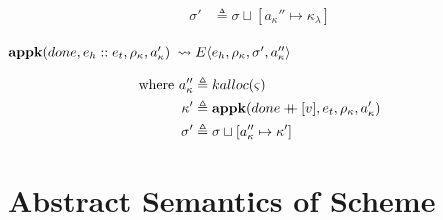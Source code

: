 \documentclass[12pt,draft]{article}
\newcommand\mdoubleplus{\ensuremath{\mathbin{+\mkern-9mu+}}}
\newcommand{\store}[0]{\sigma}
\newcommand{\kaddr}[0]{a_{\kappa}}
\newcommand{\kont}[0]{\kappa}
\newcommand{\state}[0]{\varsigma}
\newcommand{\E}[4]{E\langle #1 , #2 , #3 , #4 \rangle}
\begin{document}
\begin{multicols*}{2}
\begin{align*}
  \store' &\triangleq \store \sqcup [\kaddr'' \mapsto \kont_\lambda]
\end{align*}
\begin{center}
  $\textbf{appk}(done , e_h::e_t , \kenv , \kaddr')$
  $\leadsto \E{e_h}{\kenv}{\store'}{\kaddr''}$
\end{center}
\vspace{-7mm}
\begin{align*}
  \text{where }
  \kaddr'' &\triangleq kalloc(\state) \\
  \kont' &\triangleq \textbf{appk}(done \mdoubleplus [v] , e_t , \kenv , \kaddr') \\
  \store' &\triangleq \store \sqcup [\kaddr'' \mapsto \kont']
\end{align*}
\end{multicols*}


\newcommand{\aenv}[0]{\hat{\rho}}
\newcommand{\astore}[0]{\hat{\sigma}}
\newcommand{\aval}[0]{\hat{v}}
\newcommand{\aclo}[0]{\widehat{clo}}
\newcommand{\abaddr}[0]{\hat{a}}
\newcommand{\akaddr}[0]{\hat{a}_{\hat{\kappa}}}
\newcommand{\aballoc}[1]{\widehat{balloc}(#1)}
\newcommand{\akalloc}[1]{\widehat{kalloc}(#1)}
\newcommand{\akont}[0]{\hat{\kappa}}
\newcommand{\ectrl}[0]{e_{\hat{\varsigma}}}
\newcommand{\adone}[0]{\widehat{done}}


\newpage
\section{Abstract Semantics of Scheme}
\end{document}
